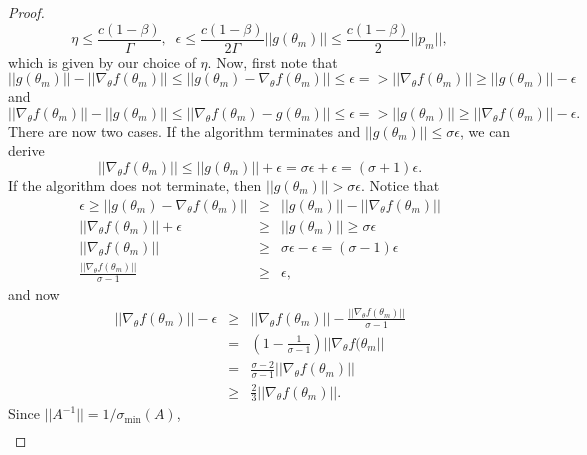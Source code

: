 \begin{proof}
\begin{equation}
    \eta \leq \frac{c(1-\beta)}{\Gamma}, \;\; \epsilon \leq \frac{c(1-\beta)}{2\Gamma}||g(\theta_m)|| \leq \frac{c(1-\beta)}{2}||p_m||,
\end{equation}
which is given by our choice of $\eta$.
Now, first note that
\begin{equation}
||g(\theta_m)|| - ||\nabla_\theta f(\theta_m)|| \leq ||g(\theta_m) - \nabla_\theta f(\theta_m)|| \leq \epsilon => ||\nabla_\theta f(\theta_m)|| \geq ||g(\theta_m)|| - \epsilon
\end{equation} 
and
\begin{equation}
||\nabla_\theta f(\theta_m)||-||g(\theta_m)|| \leq ||\nabla_\theta f(\theta_m)-g(\theta_m)|| \leq \epsilon => ||g(\theta_m)|| \geq ||\nabla_\theta f(\theta_m)|| - \epsilon.
\end{equation}
There are now two cases. 
If the algorithm terminates and $||g(\theta_m)|| \leq \sigma \epsilon$, we can derive 
\begin{equation}
    ||\nabla_\theta f(\theta_m)|| \leq ||g(\theta_m)|| + \epsilon = \sigma\epsilon+\epsilon = (\sigma+1)\epsilon.
\end{equation}
If the algorithm does not terminate, then $||g(\theta_m)|| > \sigma \epsilon$. 
Notice that 
\begin{eqnarray}
    \epsilon \geq ||g(\theta_m) - \nabla_\theta f(\theta_m)|| &\geq& ||g(\theta_m)|| - ||\nabla_\theta f(\theta_m)|| 
    \\
    ||\nabla_\theta f(\theta_m)|| + \epsilon &\geq& ||g(\theta_m)|| \geq \sigma \epsilon 
    \\
    ||\nabla_\theta f(\theta_m)|| &\geq& \sigma \epsilon - \epsilon = (\sigma - 1)\epsilon 
    \\
    \frac{||\nabla_\theta f(\theta_m)||}{\sigma-1} &\geq& \epsilon,
\end{eqnarray}
and now 
\begin{eqnarray}
    ||\nabla_\theta f(\theta_m)|| - \epsilon
    &\geq&  ||\nabla_\theta f(\theta_m)|| - \frac{||\nabla_\theta f(\theta_m)||}{\sigma-1} 
    \\
    &=& \left(1-\frac{1}{\sigma-1}\right)||\nabla_\theta f(\theta_m|| 
    \\
    &=& \frac{\sigma-2}{\sigma-1}||\nabla_\theta f(\theta_m)|| 
    \\
    &\geq& \frac{2}{3}||\nabla_\theta f(\theta_m)||.
\end{eqnarray}
Since $||A^{-1}|| = 1/\sigma_{\min}(A)$,
\begin{align}

\end{align}
\end{proof}
